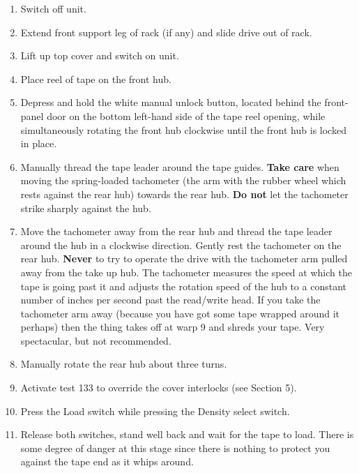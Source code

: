 \begin{enumerate}

\item Switch off unit.

\item Extend front support leg of rack (if any) and slide drive out of rack.

\item Lift up top cover and switch on unit.

\item Place reel of tape on the front hub.

\item Depress and hold the white manual unlock button, located behind the
front-panel door on the bottom left-hand side of the tape reel opening,
while simultaneously rotating the front hub clockwise until the front hub is locked
in place.

\item Manually thread the tape leader around the tape guides. {\bf Take care}
when moving the spring-loaded tachometer (the arm with the rubber wheel which
rests against the rear hub) towards the rear hub. {\bf Do not} let the
tachometer strike sharply against the hub.

\item Move the tachometer away from the rear hub and thread the tape
leader around the hub in a clockwise direction. Gently rest the tachometer on
the rear hub.
{\bf Never} to try to operate the
drive with the tachometer arm  pulled away from the take up hub. The tachometer
measures the speed at which the tape is going past it and adjusts the rotation
speed of the hub to a constant number of inches per second past the read/write
head. If you take the tachometer arm away (because you have got some tape
wrapped around it perhaps) then the thing takes off at warp 9 and shreds your
tape. Very spectacular, but not recommended.

\item Manually rotate the rear hub about three turns.

\item Activate test 133 to override the cover interlocks (see Section 5).

\item Press the Load switch while pressing the Density select switch.

\item Release both switches, stand well back and wait for the tape to load.
There is some degree of danger at this stage since there
is nothing to protect you against the tape end as it whips around.


\end{enumerate}

